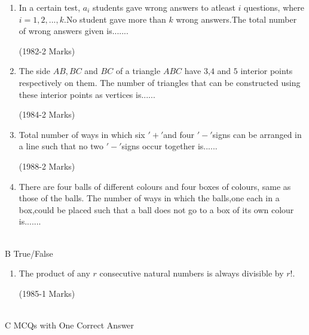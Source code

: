 \documentclass[journal,10pt,twocolumn]{IEEEtran}
\theoremstyle{remark}
\begin{document}
\begin{enumerate}
\item In a certain test, $a_i$ students gave wrong answers to atleast 
 $i$ questions, where $i=1,2,...,k.$No student gave more than 
 $k$ wrong answers.The total number of wrong answers
 given is.......
 
\hfill {(1982-2 Marks)} \\

\item The side $AB,BC$ and $BC$ of a triangle $ABC$ have $3$,$4$ and $5$ 
 interior points respectively on them. The number of triangles
 that can be constructed using these interior points as
 vertices is......
 
\hfill {(1984-2 Marks)} \\

\item Total number of ways in which six $'+'$and four $'-'$signs can
 be arranged in a line such that no two $'-'$signs occur together
 is......
 
\hfill  {(1988-2 Marks)} \\

\item There are four balls of different colours and four boxes of
 colours, same as those of the balls. The number of ways in
 which the balls,one each in a box,could be placed such that
 a ball does not go to a box of its own colour is.......\\
\\
\end{enumerate}
 B True/False \\
 \begin{enumerate}
\item The product of any $r$ consecutive natural numbers is always
 divisible by $r!.$
 
\hfill {(1985-1 Marks)}  \\
\\
 \end{enumerate}
C MCQs with One Correct Answer\\
\\
\end{document}
